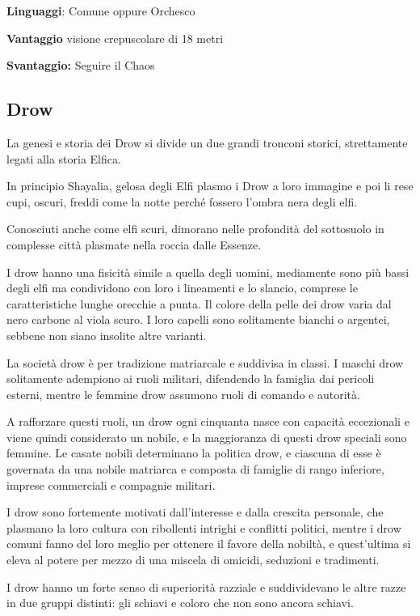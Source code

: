 \documentclass[a4paper,11pt,twoside,openany]{book}
\begin{document}
\textbf{Linguaggi}: Comune oppure Orchesco

\textbf{Vantaggio} visione crepuscolare di 18 metri

\textbf{Svantaggio:} Seguire il Chaos

\subsection{Drow}

\label{drow}

La genesi e storia dei Drow si divide un due grandi tronconi storici, strettamente legati alla storia Elfica.

In principio Shayalia, gelosa degli Elfi plasmo i Drow a loro immagine e poi li rese cupi, oscuri, freddi come la notte perché fossero l'ombra nera degli elfi.

Conosciuti anche come elfi scuri, dimorano nelle profondità del sottosuolo in complesse città plasmate nella roccia dalle Essenze.

I drow hanno una fisicità simile a quella degli uomini, mediamente sono più bassi degli elfi ma condividono con loro i lineamenti e lo slancio, comprese le caratteristiche lunghe orecchie a punta. Il colore della pelle dei drow varia dal nero carbone al viola scuro. I loro capelli sono solitamente bianchi o argentei, sebbene non siano insolite altre varianti.

La società drow è per tradizione matriarcale e suddivisa in classi. I maschi drow solitamente adempiono ai ruoli militari, difendendo la famiglia dai pericoli esterni, mentre le femmine drow assumono ruoli di comando e autorità.

A rafforzare questi ruoli, un drow ogni cinquanta nasce con capacità eccezionali e viene quindi considerato un nobile, e la maggioranza di questi drow speciali sono femmine. Le casate nobili determinano la politica drow, e ciascuna di esse è governata da una nobile matriarca e composta di famiglie di rango inferiore, imprese commerciali e compagnie militari.

I drow sono fortemente motivati dall'interesse e dalla crescita personale, che plasmano la loro cultura con ribollenti intrighi e conflitti politici, mentre i drow comuni fanno del loro meglio per ottenere il favore della nobiltà, e quest'ultima si eleva al potere per mezzo di una miscela di omicidi, seduzioni e tradimenti.

I drow hanno un forte senso di superiorità razziale e suddividevano le altre razze in due gruppi distinti: gli schiavi e coloro che non sono ancora schiavi.
\end{document}
